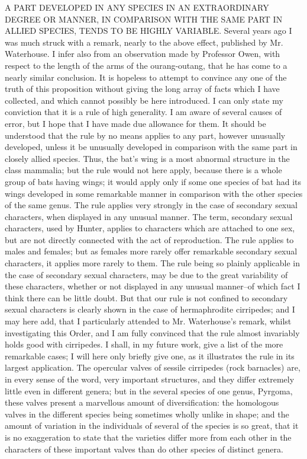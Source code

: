 A PART DEVELOPED IN ANY SPECIES IN AN EXTRAORDINARY DEGREE OR MANNER, IN COMPARISON WITH THE SAME PART IN ALLIED SPECIES, TENDS TO BE HIGHLY VARIABLE.
Several years ago I was much struck with a remark, nearly to the above effect, published by Mr. Waterhouse. I infer also from an observation made by Professor Owen, with respect to the length of the arms of the ourang-outang, that he has come to a nearly similar conclusion. It is hopeless to attempt to convince any one of the truth of this proposition without giving the long array of facts which I have collected, and which cannot possibly be here introduced. I can only state my conviction that it is a rule of high generality. I am aware of several causes of error, but I hope that I have made due allowance for them. It should be understood that the rule by no means applies to any part, however unusually developed, unless it be unusually developed in comparison with the same part in closely allied species. Thus, the bat's wing is a most abnormal structure in the class mammalia; but the rule would not here apply, because there is a whole group of bats having wings; it would apply only if some one species of bat had its wings developed in some remarkable manner in comparison with the other species of the same genus. The rule applies very strongly in the case of secondary sexual characters, when displayed in any unusual manner. The term, secondary sexual characters, used by Hunter, applies to characters which are attached to one sex, but are not directly connected with the act of reproduction. The rule applies to males and females; but as females more rarely offer remarkable secondary sexual characters, it applies more rarely to them. The rule being so plainly applicable in the case of secondary sexual characters, may be due to the great variability of these characters, whether or not displayed in any unusual manner--of which fact I think there can be little doubt. But that our rule is not confined to secondary sexual characters is clearly shown in the case of hermaphrodite cirripedes; and I may here add, that I particularly attended to Mr. Waterhouse's remark, whilst investigating this Order, and I am fully convinced that the rule almost invariably holds good with cirripedes. I shall, in my future work, give a list of the more remarkable cases; I will here only briefly give one, as it illustrates the rule in its largest application. The opercular valves of sessile cirripedes (rock barnacles) are, in every sense of the word, very important structures, and they differ extremely little even in different genera; but in the several species of one genus, Pyrgoma, these valves present a marvellous amount of diversification: the homologous valves in the different species being sometimes wholly unlike in shape; and the amount of variation in the individuals of several of the species is so great, that it is no exaggeration to state that the varieties differ more from each other in the characters of these important valves than do other species of distinct genera.
